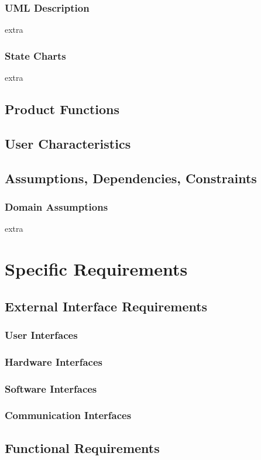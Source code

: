 \documentclass{article}
\begin{document}
		\subsubsection{UML Description}
		extra
		\subsubsection{State Charts}
		extra
	\subsection{Product Functions}
	\subsection{User Characteristics}
	\subsection{Assumptions, Dependencies, Constraints}
		\subsubsection{Domain Assumptions}
		extra


\section{Specific Requirements}
	\subsection{External Interface Requirements}
		\subsubsection{User Interfaces}
		\subsubsection{Hardware Interfaces}
		\subsubsection{Software Interfaces}
		\subsubsection{Communication Interfaces}
	\subsection{Functional Requirements}
\end{document}
